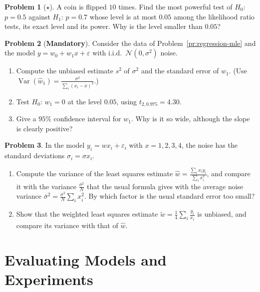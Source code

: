\documentclass[11pt]{article}
\theoremstyle{definition}
\newtheorem{problem}{Problem}[section]
\newcommand{\mandatory}{\textcolor{red!70!black}{\textbf{Mandatory}}}
\DeclareMathOperator{\Var}{Var}
\begin{document}
\begin{problem}[$\star$]\label{pr:np-coin}
    A coin is flipped $10$ times. Find the most powerful test of $H_0$: $p = 0.5$ against $H_1$: $p = 0.7$ whose level is at most $0.05$ among the likelihood ratio tests, its exact level and its power. Why is the level smaller than $0.05$?
\end{problem}

\begin{problem}[\mandatory]\label{pr:regression-t}
    Consider the data of Problem~\ref{pr:regression-mle} and the model $y = w_0 + w_1x + \varepsilon$ with i.i.d.\ $\mathcal{N}(0, \sigma^2)$ noise.
    \begin{enumerate}[label=(\alph*)]
        \item Compute the unbiased estimate $s^2$ of $\sigma^2$ and the standard error of $\hat w_1$. (Use $\Var(\hat w_1) = \frac{\sigma^2}{\sum_i (x_i - \bar x)^2}$.)
        \item Test $H_0$: $w_1 = 0$ at the level $0.05$, using $t_{2, 0.975} = 4.30$.
        \item Give a $95\%$ confidence interval for $w_1$. Why is it so wide, although the slope is clearly positive?
    \end{enumerate}
\end{problem}

\begin{problem}\label{pr:hetero-practice}
    In the model $y_i = wx_i + \varepsilon_i$ with $x = 1, 2, 3, 4$, the noise has the standard deviations $\sigma_i = \sigma x_i$.
    \begin{enumerate}[label=(\alph*)]
        \item Compute the variance of the least squares estimate $\hat w = \frac{\sum_i x_iy_i}{\sum_i x_i^2}$, and compare it with the variance $\frac{\sigma^2}{N}$ that the usual formula gives with the average noise variance $\bar\sigma^2 = \frac{\sigma^2}{N}\sum_i x_i^2$. By which factor is the usual standard error too small?
        \item Show that the weighted least squares estimate $\tilde w = \frac{1}{4}\sum_i \frac{y_i}{x_i}$ is unbiased, and compare its variance with that of $\hat w$.
    \end{enumerate}
\end{problem}

\section{Evaluating Models and Experiments}
\end{document}
